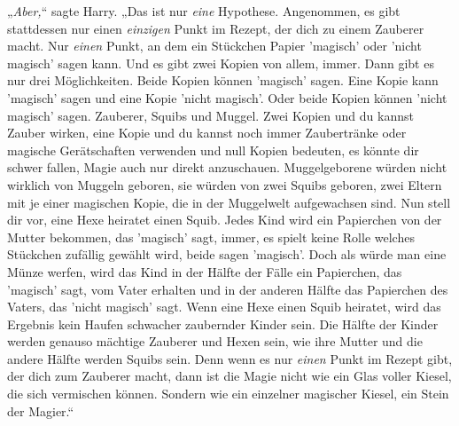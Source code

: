 „\emph{Aber,}“ sagte Harry. „Das ist nur \emph{eine} Hypothese. Angenommen, es gibt stattdessen nur einen \emph{einzigen} Punkt im Rezept, der dich zu einem Zauberer macht. Nur \emph{einen} Punkt, an dem ein Stückchen Papier 'magisch' oder 'nicht magisch' sagen kann. Und es gibt zwei Kopien von allem, immer. Dann gibt es nur drei Möglichkeiten. Beide Kopien können 'magisch' sagen. Eine Kopie kann 'magisch' sagen und eine Kopie 'nicht magisch'. Oder beide Kopien können 'nicht magisch' sagen. Zauberer, Squibs und Muggel. Zwei Kopien und du kannst Zauber wirken, eine Kopie und du kannst noch immer Zaubertränke oder magische Gerätschaften verwenden und null Kopien bedeuten, es könnte dir schwer fallen, Magie auch nur direkt anzuschauen. Muggelgeborene würden nicht wirklich von Muggeln geboren, sie würden von zwei Squibs geboren, zwei Eltern mit je einer magischen Kopie, die in der Muggelwelt aufgewachsen sind. Nun stell dir vor, eine Hexe heiratet einen Squib. Jedes Kind wird ein Papierchen von der Mutter bekommen, das 'magisch' sagt, immer, es spielt keine Rolle welches Stückchen zufällig gewählt wird, beide sagen 'magisch'. Doch als würde man eine Münze werfen, wird das Kind in der Hälfte der Fälle ein Papierchen, das 'magisch' sagt, vom Vater erhalten und in der anderen Hälfte das Papierchen des Vaters, das 'nicht magisch' sagt. Wenn eine Hexe einen Squib heiratet, wird das Ergebnis kein Haufen schwacher zaubernder Kinder sein. Die Hälfte der Kinder werden genauso mächtige Zauberer und Hexen sein, wie ihre Mutter und die andere Hälfte werden Squibs sein. Denn wenn es nur \emph{einen} Punkt im Rezept gibt, der dich zum Zauberer macht, dann ist die Magie nicht wie ein Glas voller Kiesel, die sich vermischen können. Sondern wie ein einzelner magischer Kiesel, ein Stein der Magier.“%

